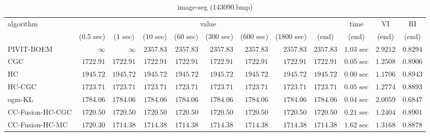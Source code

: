 \begin{table}[H]
\scriptsize
\centering
\caption{image-seg (143090.bmp)}
\label{tab:anytimetable-image-seg-143090.bmp}
\begin{tabular}{lrrrrrrrrrrr}
\toprule
           algorithm &                                   \multicolumn{8}{c}{value} & \multicolumn{1}{c}{time}    & \multicolumn{1}{c}{VI}  & \multicolumn{1}{c}{RI} \\  
\cmidrule(lr){2-9}\cmidrule(lr){10-10} \cmidrule(lr){11-11} \cmidrule(lr){12-12}   
                     & \multicolumn{1}{c}{(0.5 sec)} & \multicolumn{1}{c}{(1 sec)} & \multicolumn{1}{c}{(10 sec)} & \multicolumn{1}{c}{(60 sec)} & \multicolumn{1}{c}{(300 sec)} & \multicolumn{1}{c}{(600 sec)} & \multicolumn{1}{c}{(1800 sec)} & \multicolumn{1}{c}{(end)} & \multicolumn{1}{c}{(end)}    & \multicolumn{1}{c}{(end)}   & \multicolumn{1}{c}{(end)}  \\ \midrule 
          PIVIT-BOEM & $\infty$ & $\infty$ & $      2357.83$ & $      2357.83$ & $      2357.83$ & $      2357.83$ & $      2357.83$ & $      2357.83$ & $         1.03$ sec    & $       2.9212$  & $       0.8294$ \\ 
                 CGC & $      1722.91$ & $      1722.91$ & $      1722.91$ & $      1722.91$ & $      1722.91$ & $      1722.91$ & $      1722.91$ & $      1722.91$ & $         0.05$ sec    & $       1.2508$  & $       0.8906$ \\ 
                  HC & $      1945.72$ & $      1945.72$ & $      1945.72$ & $      1945.72$ & $      1945.72$ & $      1945.72$ & $      1945.72$ & $      1945.72$ & $         0.00$ sec    & $       1.1706$  & $       0.8943$ \\ 
              HC-CGC & $      1723.71$ & $      1723.71$ & $      1723.71$ & $      1723.71$ & $      1723.71$ & $      1723.71$ & $      1723.71$ & $      1723.71$ & $         0.05$ sec    & $       1.2774$  & $       0.8893$ \\ 
              ogm-KL & $      1784.06$ & $      1784.06$ & $      1784.06$ & $      1784.06$ & $      1784.06$ & $      1784.06$ & $      1784.06$ & $      1784.06$ & $         0.04$ sec    & $       2.0059$  & $       0.6847$ \\ 
    CC-Fusion-HC-CGC & $      1720.50$ & $      1720.50$ & $      1720.50$ & $      1720.50$ & $      1720.50$ & $      1720.50$ & $      1720.50$ & $      1720.50$ & $         0.21$ sec    & $       1.2404$  & $       0.8901$ \\ 
     CC-Fusion-HC-MC & $      1720.30$ & $      1714.38$ & $      1714.38$ & $      1714.38$ & $      1714.38$ & $      1714.38$ & $      1714.38$ & $      1714.38$ & $         1.62$ sec    & $       1.3168$  & $       0.8878$ \\ 

\end{tabular}
\end{table}
